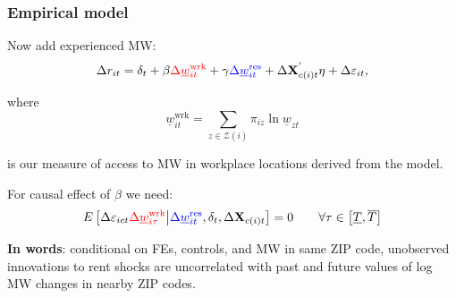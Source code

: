 \documentclass[aspectratio=169, t]{beamer}
\newcommand{\Z}{\mathcal{Z}}
\newcommand{\MW}{\underline{w}}
\begin{document}
\begin{frame}
	\frametitle{Empirical model}
		
	Now add experienced MW:
	$$
	\Delta r_{it} = \delta_t +
	    \beta {\color{red}\Delta \MW^{\text{wrk}}_{it}} +
		\gamma {\color{blue} \Delta \MW^{\text{res}}_{it}} + 
		\Delta \mathbf{X}^{'}_{c(i)t} \eta + 
		\Delta \varepsilon_{it} ,
	$$
	
	where 
	\[
	\MW^{\text{wrk}}_{it} = 
	\sum_{z \in \Z(i)} \pi_{i z} \ln \underline{w}_{zt}
	\] 
	
	is our measure of access to MW in workplace locations derived from the model.


	\pause
	\vspace{2mm}
	For causal effect of $\beta$ we need:
	$$
	E \left[\Delta \varepsilon_{ict} {\color{red} \Delta 
	\MW^{\text{wrk}}_{i\tau}} 
	\big| {\color{blue}\Delta \MW^{\text{res}}_{it}}, \delta_t, \Delta 
	\mathbf{X}_{c(i)t} \right] = 0
	\quad \quad \forall \tau \in \left[ \underline{T}, \overline{T} \right]
	$$
	
	\pause
	\vspace{2mm}
	\textbf{In words}: conditional on FEs, controls, and {\color{blue} MW in same ZIP 
	code}, unobserved innovations to rent shocks are uncorrelated with past and future 
	values of log MW changes {\color{red} in nearby ZIP codes}.
\end{frame}
\end{document}
